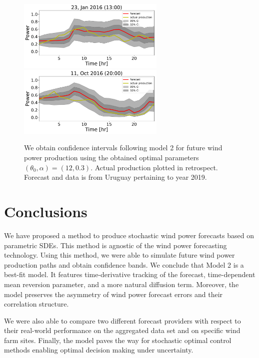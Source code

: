 \documentclass[11pt]{article}
\begin{document}
    \begin{figure}[h]
      \includegraphics[width=70mm,scale=1]{confidence_intervals/24hr/31.pdf}
      \includegraphics[width=70mm,scale=1]{confidence_intervals/24hr/820.pdf}
       \caption{We obtain confidence intervals following model 2  for future wind power production using the obtained optimal parameters $(\theta_0, \alpha )=(12,0.3)$. Actual production plotted in retrospect. Forecast and data is from Uruguay pertaining to  year 2019.}
    \end{figure}

\section{Conclusions} \label{Section_8}

We have proposed a method to produce stochastic wind power forecasts based on parametric SDEs. This method is agnostic of the wind power forecasting technology. Using this method, we were able to simulate future wind power production paths and obtain confidence bands. We conclude that Model 2 is a best-fit model. It features time-derivative tracking of the forecast, time-dependent mean reversion parameter, and a more natural diffusion term. Moreover, the model preserves the asymmetry of wind power forecast errors and their correlation structure.

We were also able to compare two different forecast providers with respect to their real-world performance on the aggregated data set and on specific wind farm sites. Finally, the model paves the way for stochastic optimal control methods enabling optimal decision making under uncertainty.


\nocite{*}
 
\printbibliography[keyword={Wind-SDE},title={References}]
\end{document}
